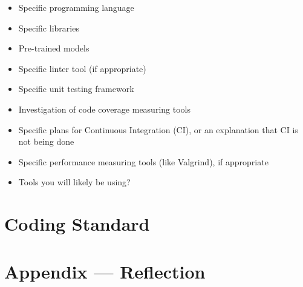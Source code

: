 \documentclass{article}
\begin{document}
\begin{itemize}
\item Specific programming language
\item Specific libraries
\item Pre-trained models
\item Specific linter tool (if appropriate)
\item Specific unit testing framework
\item Investigation of code coverage measuring tools
\item Specific plans for Continuous Integration (CI), or an explanation that CI
  is not being done
\item Specific performance measuring tools (like Valgrind), if
  appropriate
\item Tools you will likely be using?
\end{itemize}


\section{Coding Standard}


\newpage{}

\section*{Appendix --- Reflection}
\end{document}

